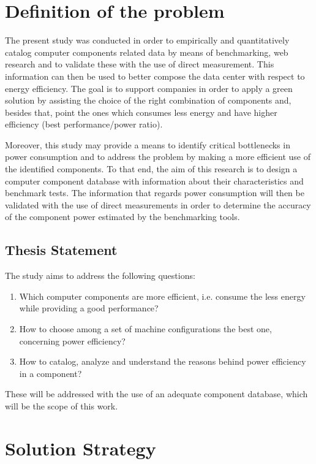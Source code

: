 \section{Definition of the problem} \label{sec1:problem}

    The present study was conducted in order to empirically and quantitatively catalog computer components related data by means of benchmarking, web research and to validate these with the use of direct measurement. This information can then be used to better compose the data center with respect to energy efficiency. The goal is to support companies in order to apply a green solution by assisting the choice of the right combination of components and, besides that, point the ones which consumes less energy and have higher efficiency (best performance/power ratio).
    
    Moreover, this study may provide a means to identify critical bottlenecks in power consumption and to address the problem by making a more efficient use of the identified components. To that end, the aim of this research is to design a computer component database with information about their characteristics and benchmark tests. The information that regards power consumption will then be validated with the use of direct measurements in order to determine the accuracy of the component power estimated by the benchmarking tools.
    
    \subsection{Thesis Statement}\label{sec1:thesis_statement}
        The study aims to address the following questions:
        \begin{enumerate}
	        \item Which computer components are more efficient, i.e. consume the less energy while providing a good performance?
	        \item How to choose among a set of machine configurations the best one, concerning power efficiency?
	        \item How to catalog, analyze and understand the reasons behind power efficiency in a component?
        \end{enumerate}
        
    These will be addressed with the use of an adequate component database, which will be the scope of this work.

\section{Solution Strategy} \label{sec1:solution_strategy}

